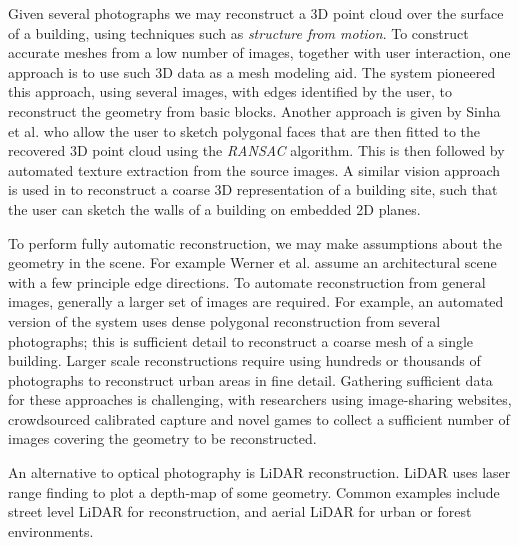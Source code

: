 Given several photographs we may reconstruct a 3D point cloud over the surface of a building, using techniques such as \emph{structure from motion}\cite{Dellaert00}. To construct accurate meshes from a low number of images, together with user interaction, one approach is to use such 3D data as a mesh modeling aid.
The \emph{\Facade{}}\cite{Debevec96} system pioneered this approach, using several images, with edges identified by the user, to reconstruct the geometry from basic blocks. Another approach is given by Sinha et al.\cite{Sinha08} who allow the user to sketch polygonal faces that are then fitted to the recovered 3D point cloud using the \emph{RANSAC} algorithm. This is then followed by automated texture extraction from the source images. A similar vision approach is used in \cite{Paczkowski11} to reconstruct a coarse 3D representation of a building site, such that the user can sketch the walls of a building on embedded 2D planes.

To perform fully automatic reconstruction, we may make assumptions about the geometry in the scene. For example Werner et al.\cite{Werner02} assume an architectural scene with a few principle edge directions. To automate reconstruction from general images, generally a larger set of images are required. For example, an automated version of the \Facade{} system uses dense polygonal reconstruction from several photographs\cite{Pollefeys04}; this is sufficient detail to reconstruct a coarse mesh of a single building. Larger scale reconstructions require using hundreds or thousands of photographs to reconstruct urban areas in fine detail. Gathering sufficient data for these approaches is challenging, with researchers using image-sharing websites\cite{Agarwal09}, crowdsourced calibrated capture\cite{Irschara11} and novel games\cite{Tuite11} to collect a sufficient number of images covering the geometry to be reconstructed. 

An alternative to optical photography is LiDAR reconstruction. LiDAR uses laser range finding to plot a depth-map of some geometry. Common examples include street level LiDAR for \facade{} reconstruction\cite{Pu09}, and aerial LiDAR for urban\cite{Zhou08} or forest environments\cite{Morsdorf04}.



